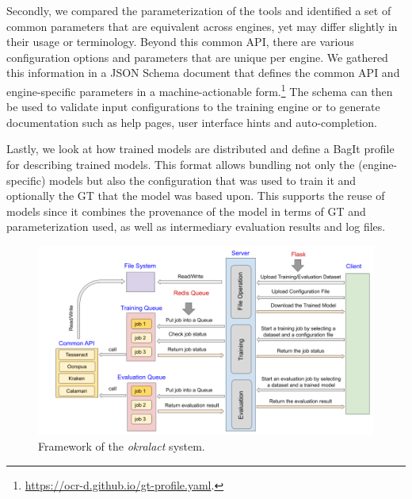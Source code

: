 \documentclass[sigconf]{acmart}
\begin{document}
Secondly, we compared the parameterization of the tools and
identified a set of common parameters that are equivalent across
engines, yet may differ slightly in their usage or terminology.
Beyond this common API, there are various configuration options and
parameters that are unique per engine. We gathered this information
in a JSON Schema document that defines the common API and
engine-specific parameters in a machine-actionable
form.\footnote{\url{https://ocr-d.github.io/gt-profile.yaml}.} The
schema can then be used to validate input configurations to the
training engine or to generate documentation such as help pages,
user interface hints and auto-completion.

Lastly, we look at how trained models are distributed and
define a BagIt \cite{kunze2018bagit} profile for describing trained models. 
This format allows bundling not only the (engine-specific) models but
also the configuration that was used to train it and optionally the
GT that the model was based upon. This supports the reuse of models 
since it combines the provenance of the model in terms of GT and 
parameterization used, as well as  intermediary evaluation results and 
log files.


\begin{figure}[ht!]
    \begin{center}
        \includegraphics[width=1\linewidth]{Figures/Framework.png}
    \end{center}
    \caption{Framework of the \textit{okralact} system.}
    \label{fig:framework}
\end{figure}
\end{document}
